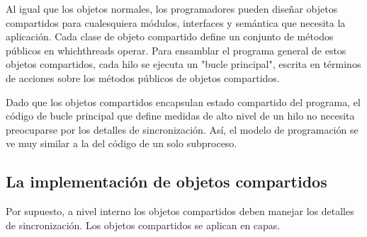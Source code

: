 \documentclass[10pt]{book}
\begin{document}
Al igual que los objetos normales, los programadores pueden diseñar objetos compartidos para cualesquiera módulos, interfaces y semántica que necesita la aplicación. Cada clase de objeto compartido define un conjunto de métodos públicos en whichthreads operar. Para ensamblar el programa general de estos objetos compartidos, cada hilo se ejecuta un "bucle principal", escrita en términos de acciones sobre los métodos públicos de objetos compartidos.

Dado que los objetos compartidos encapsulan estado compartido del programa, el código de bucle principal que define medidas de alto nivel de un hilo no necesita preocuparse por los detalles de sincronización. Así, el modelo de programación se ve muy similar a la del código de un solo subproceso.

\subsection{La implementación de objetos compartidos}
Por supuesto, a nivel interno los objetos compartidos deben manejar los detalles de sincronización. Los objetos compartidos se aplican en capas.
\end{document}

